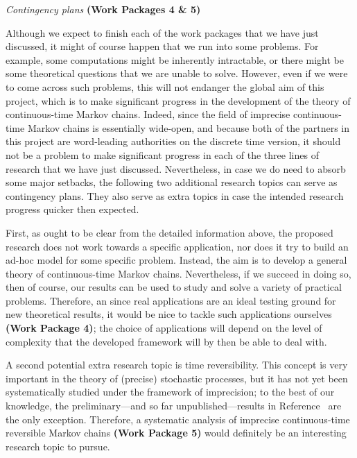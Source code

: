 \documentclass[11pt,dvipsnames,usenames,a4paper]{article}
\begin{document}
\emph{Contingency plans} {\bf (Work Packages 4 \& 5)} 
\vspace{3pt}

Although we expect to finish each of the work packages that we have just discussed, it might of course happen that we run into some problems. For example, some computations might be inherently intractable, or there might be some theoretical questions that we are unable to solve. However, even if we were to come across such problems, this will not endanger the global aim of this project, which is to make significant progress in the development of the theory of continuous-time Markov chains. Indeed, since the field of imprecise continuous-time Markov chains is essentially wide-open, and because both of the partners in this project are word-leading authorities on the discrete time version, it should not be a problem to make significant progress in each of the three lines of research that we have just discussed.
Nevertheless, in case we do need to absorb some major setbacks,  the following two additional research topics can serve as contingency plans. They also serve as extra topics in case the intended research progress quicker then expected.


First, as ought to be clear from the detailed information above, the proposed research does not work towards a specific application, nor does it try to build an ad-hoc model for some specific problem.
Instead, the aim is to develop a general theory of continuous-time Markov chains.
Nevertheless, if we succeed in doing so, then of course, our results can be used to study and solve a variety of practical problems. Therefore, an since real applications are an ideal testing ground for new theoretical results, it would be nice to tackle such applications ourselves {\bf (Work Package 4)}; the choice of applications will depend on the level of complexity that the developed framework will by then be able to deal with.

A second potential extra research topic is time reversibility.
This concept is very important in the theory of (precise) stochastic processes, but it has not yet been systematically studied under the framework of imprecision; to the best of our knowledge, the preliminary---and so far unpublished---results in Reference~\cite{skulj:16} are the only exception. Therefore, a systematic analysis of imprecise continuous-time reversible Markov chains {\bf (Work Package 5)} would definitely be an interesting research topic to pursue. %
\end{document}
